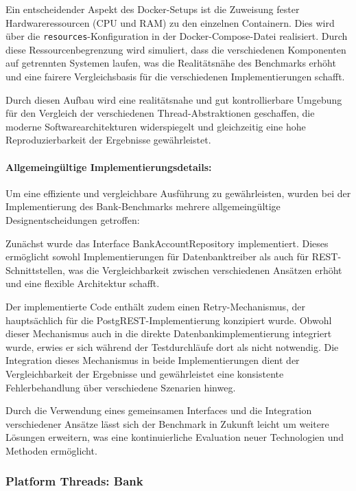 \documentclass[fontsize=12pt,paper=a4,twoside=semi,parskip=half-,headsepline,headinclude]{scrreprt}
\begin{document}
Ein entscheidender Aspekt des Docker-Setups ist die Zuweisung fester Hardwareressourcen (CPU und RAM) zu den einzelnen Containern. Dies wird über die \texttt{resources}-Konfiguration in der Docker-Compose-Datei realisiert. Durch diese Ressourcenbegrenzung wird simuliert, dass die verschiedenen Komponenten auf getrennten Systemen laufen, was die Realitätsnähe des Benchmarks erhöht und eine fairere Vergleichsbasis für die verschiedenen Implementierungen schafft.

Durch diesen Aufbau wird eine realitätsnahe und gut kontrollierbare Umgebung für den Vergleich der verschiedenen Thread-Abstraktionen geschaffen, die moderne Softwarearchitekturen widerspiegelt und gleichzeitig eine hohe Reproduzierbarkeit der Ergebnisse gewährleistet.

\paragraph{Allgemeingültige Implementierungsdetails:}

Um eine effiziente und vergleichbare Aus\-füh\-rung zu gewährleisten, wurden bei der Implementierung des Bank-Bench\-marks  mehrere allgemeingültige Designentscheidungen getroffen:

Zunächst wurde das Interface BankAccountRepository implementiert. Dieses ermöglicht sowohl Implementierungen für Datenbanktreiber als auch für REST-Schnittstellen, was die Vergleichbarkeit zwischen verschiedenen Ansätzen erhöht und eine flexible Architektur schafft.

Der implementierte Code enthält zudem einen Retry-Mechanismus, der hauptsächlich für die PostgREST-Implementierung konzipiert wurde. Obwohl dieser Mechanismus auch in die direkte Datenbankimplementierung integriert wurde, erwies er sich während der Testdurchläufe dort als nicht notwendig. Die Integration dieses Mechanismus in beide Implementierungen dient der Vergleichbarkeit der Ergebnisse und gewährleistet eine konsistente Fehlerbehandlung über verschiedene Szenarien hinweg.

Durch die Verwendung eines gemeinsamen Interfaces und die Integration verschiedener Ansätze lässt sich der Benchmark in Zukunft leicht um weitere Lösungen erweitern, was eine kontinuierliche Evaluation neuer Technologien und Methoden ermöglicht.


\subsubsection{Platform Threads: Bank}
\end{document}
